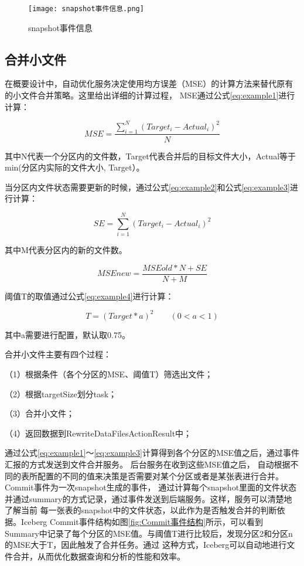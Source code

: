 \begin{figure}[H]
  \centering
  \texttt{[image: snapshot事件信息.png]}
  \caption{snapshot事件信息}
  \label{fig:snapshot事件信息}
\end{figure}

\subsection{合并小文件}

在概要设计中，自动优化服务决定使用均方误差（MSE）的计算方法来替代原有的小文件合并策略。这里给出详细的计算过程，
MSE通过公式\ref{eq:example1}进行计算：

\begin{equation}
  MSE=\frac {\sum_{i=1}^{N}{(Target_i - Actual_i)^2}} {N}
  \label{eq:example1}
\end{equation}

其中N代表一个分区内的文件数，Target代表合并后的目标文件大小，Actual等于min(分区内实际的文件大小, Target）。

当分区内文件状态需要更新的时候，通过公式\ref{eq:example2}和公式\ref{eq:example3}进行计算：

\begin{equation}
  SE=\sum_{i=1}^{N}{(Target_i - Actual_i)^2}
  \label{eq:example2}
\end{equation}

其中M代表分区内的新的文件数。

\begin{equation}
  MSEnew=\frac {MSEold*N+SE} {N+M}
  \label{eq:example3}
\end{equation}

阈值T的取值通过公式\ref{eq:example4}进行计算：

\begin{equation}
  T=(Target*a)^2 \qquad (0<a<1)
  \label{eq:example4}
\end{equation}

其中a需要进行配置，默认取0.75。

合并⼩⽂件主要有四个过程：

（1）根据条件（各个分区的MSE、阈值T）筛选出⽂件；

（2）根据targetSize划分task；

（3）合并⼩⽂件；

（4）返回数据到RewriteDataFilesActionResult中；

通过公式\ref{eq:example1}～\ref{eq:example3}计算得到各个分区的MSE值之后，通过事件汇报的方式发送到文件合并服务。
后台服务在收到这些MSE值之后，
自动根据不同的表所配置的不同的值来决策是否需要对某个分区或者是某张表进行合并。 Commit事件为一次snapshot生成的事件，
通过计算每个snapshot里面的文件状态并通过summary的方式记录，通过事件发送到后端服务。这样，服务可以清楚地了解当前
每一张表的snapshot中的文件状态，以此作为是否触发合并的判断依据。Iceberg Commit事件结构如图\ref{fig:Commit事件结构}所示，可以看到
Summary中记录了每个分区的MSE值。与阈值T进行比较后，发现分区2和分区n的MSE大于T，因此触发了合并任务。通过
这种方式，Iceberg可以自动地进行文件合并，从而优化数据查询和分析的性能和效率。

